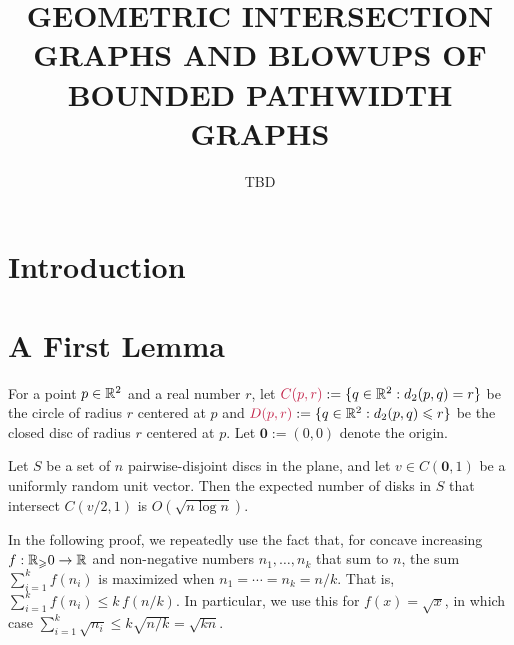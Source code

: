 \documentclass{patmorin}
\title{\MakeUppercase{\boldmath Geometric Intersection Graphs and Blowups of Bounded Pathwidth Graphs}}
\author{TBD}
\date{}
\makeatletter
\renewcommand{\ge}{\geqslant}
\renewcommand{\le}{\leqslant}
\def\mathcolor#1#{\@mathcolor{#1}}
\def\@mathcolor#1#2#3{%
  \protect\leavevmode
  \begingroup
    \color#1{#2}#3%
  \endgroup
}
\newcommand{\mathdefin}[1]{\mathcolor{brightmaroon}{#1}}
\makeatother
\begin{document}
\maketitle

\section{Introduction}


\section{A First Lemma}

For a point $p\in\mathbb{R}^2$ and a real number $r$, let $\mathdefin{C(p,r)}:=\{q\in\R^2: d_2(p,q)=r\}$ be the circle of radius $r$ centered at $p$ and $\mathdefin{D(p,r)}:=\{q\in\R^2: d_2(p,q)\le r\}$ be the closed disc of radius $r$ centered at $p$.  Let $\mathbf{0}:=(0,0)$ denote the origin.

\begin{lem}
  Let $S$ be a set of $n$ pairwise-disjoint discs in the plane, and let $v\in C(\mathbf{0},1)$ be a uniformly random unit vector.  Then the expected number of disks in $S$ that intersect $C(v/2,1)$ is $O(\sqrt{n\log n})$.
\end{lem}

In the following proof, we repeatedly use the fact that, for concave increasing $f:\R_\ge 0\to\R$ and non-negative numbers $n_1,\ldots,n_k$ that sum to $n$, the sum $\sum_{i=1}^k f(n_i)$ is maximized when $n_1=\cdots=n_k=n/k$.  That is, $\sum_{i=1}^k f(n_i) \le k\,f(n/k)$.  In particular, we use this for $f(x)=\sqrt{x}$, in which case $\sum_{i=1}^k \sqrt{n_i}\le k\sqrt{n/k}=\sqrt{kn}$.
\end{document}
